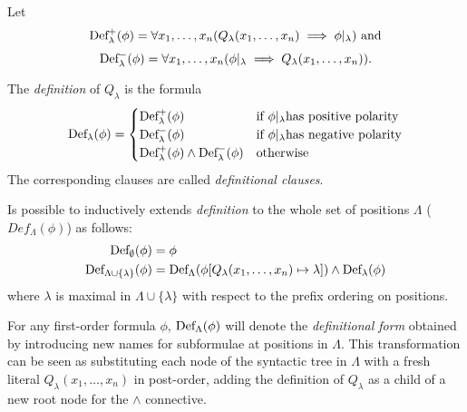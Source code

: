 Let 
  \[\fldef{\lambda}[+]{\phi} = \forall x_1, \ldots, x_n(Q_\lambda(x_1,\ldots,x_n)\implies \phi|_\lambda) \text{ and}\]
  \[\fldef{\lambda}[-]{\phi} = \forall x_1, \ldots, x_n(\phi|_\lambda \implies Q_\lambda(x_1,\ldots,x_n)).\]

The \emph{definition} of \(Q_\lambda\) is the formula
\begin{equation}
  \fldef{\lambda}{\phi} = \begin{cases}
                        \fldef{\lambda}[+]{\phi} & \text{if } \phi|_\lambda \text{has positive polarity}\\
                        \fldef{\lambda}[-]{\phi} & \text{if } \phi|_\lambda \text{has negative polarity}\\
                        \fldef{\lambda}[+]{\phi} \land \fldef{\lambda}[-]{\phi} & \text{otherwise}
                      \end{cases}
\end{equation}
The corresponding clauses are called \emph{definitional clauses}.

Is possible to inductively extends \emph{definition} to the whole set of positions \(\Lambda\) (\(Def_\Lambda(\phi)\)) as follows:
\begin{equation}
  \begin{aligned}
    \fldef{\emptyset}{\phi} &= \phi\\
    \fldef{\Lambda\cup\{\lambda\}}{\phi} &= \fldef{\Lambda}{\phi[Q_\lambda(x_1,\ldots,x_n)\mapsto\lambda]} \land \fldef{\lambda}{\phi}
  \end{aligned}
\end{equation}
where \(\lambda\) is maximal in \(\Lambda\cup\{\lambda\}\) with respect to the prefix ordering on positions.

For any first-order formula \(\phi\), \(\fldef{\Lambda}{\phi}\) will denote the \emph{definitional form} obtained by introducing new names for subformulae at positions in \(\Lambda\).
This transformation can be seen as substituting each node of the syntactic tree in \(\Lambda\) with a fresh literal \(Q_\lambda(x_1,\ldots,x_n)\) in post-order, adding the definition of \(Q_\lambda\) as a child of a new root node for the \(\land\) connective.

